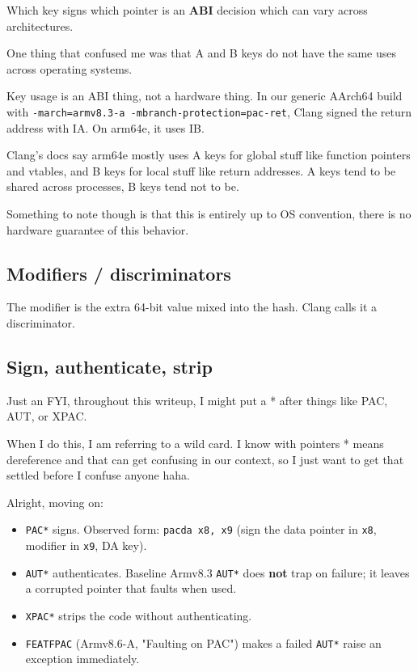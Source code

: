 Which key signs which pointer is an \textbf{ABI} decision which can vary across architectures.

One thing that confused me was that A and B keys do not have the same uses across operating systems.

Key usage is an ABI thing, not a hardware thing. In our generic AArch64 build with \texttt{-march=armv8.3-a -mbranch-protection=pac-ret}, Clang signed the return address with IA. On arm64e, it uses IB.

Clang's docs say arm64e mostly uses A keys for global stuff like function pointers and vtables, and B keys for local stuff like return addresses. A keys tend to be shared across processes, B keys tend not to be.

Something to note though is that this is entirely up to OS convention, there is no hardware guarantee of this behavior.

\subsection{Modifiers / discriminators}

The modifier is the extra 64-bit value mixed into the hash. Clang calls it a discriminator.

\subsection{Sign, authenticate, strip}

Just an FYI, throughout this writeup, I might put a * after things like PAC, AUT, or XPAC.

When I do this, I am referring to a wild card. I know with pointers * means dereference and that can get confusing in our context, so I just want to get that settled before I confuse anyone haha.

Alright, moving on:

\begin{itemize}
\item \texttt{PAC*} signs. Observed form: \texttt{pacda x8, x9} (sign the data pointer in \texttt{x8}, modifier in \texttt{x9}, DA key).
\item \texttt{AUT*} authenticates. Baseline Armv8.3 \texttt{AUT*} does \textbf{not} trap on failure; it leaves a corrupted pointer that faults when used.
\item \texttt{XPAC*} strips the code without authenticating.
\item \texttt{FEAT\uscore{}FPAC} (Armv8.6-A, "Faulting on PAC") makes a failed \texttt{AUT*} raise an exception immediately.
\end{itemize}

